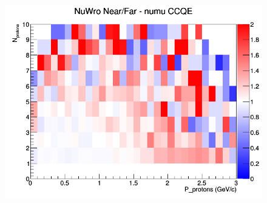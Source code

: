 \begin{figure}[h]
\endminipage
{}
\includegraphics[width=\linewidth]{N_P/nominal/protons/ratios/CCQE_NuWro_numu_NF_N_P.png}
\endminipage
\newline
\end{figure}
\clearpage
